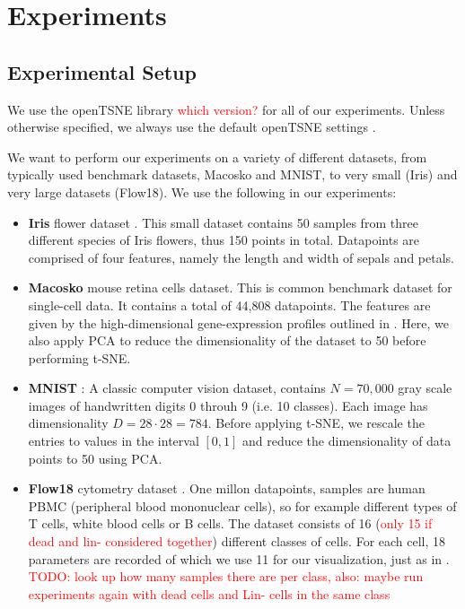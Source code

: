 \chapter{Experiments}\label{chapter:experiments}

\section{Experimental Setup}
We use the openTSNE library \textcolor{red}{which version?} for all of our experiments. Unless otherwise specified, we always use the default openTSNE settings . 

We want to perform our experiments on a variety of different datasets, from typically used benchmark datasets, Macosko and MNIST, to very small (Iris) and very large datasets (Flow18). We use the following in our experiments: 
\begin{itemize}
    \item \textbf{Iris} flower dataset \cite{iris_dataset}. This small dataset contains 50 samples from three different species of Iris flowers, thus 150 points in total. Datapoints are comprised of four features, namely the length and width of sepals and petals. 
    \item \textbf{Macosko} mouse retina cells dataset\cite{Macosko_dataset}. This is common benchmark dataset for single-cell data. It contains a total of 44,808 datapoints. The features are given by the high-dimensional gene-expression profiles outlined in \cite{Macosko_dataset}. 
    Here, we also apply PCA to reduce the dimensionality of the dataset to 50 before performing t-SNE. 
    \item \textbf{MNIST} \cite{mnist_dataset}: A classic computer vision dataset, contains $N=70,000$ gray scale images of handwritten digits 0 throuh 9 (i.e. 10 classes). 
    Each image has dimensionality $D=28 \cdot 28 = 784$. Before applying t-SNE, we rescale the entries to values in the interval $[0,1]$ and reduce the dimensionality of data points to 50 using PCA.  
    \item \textbf{Flow18} cytometry dataset \cite{flow_dataset}. 
    One millon datapoints, samples are human PBMC (peripheral blood mononuclear cells), so for example different types of T cells, white blood cells or B cells. 
    The dataset consists of 16 (\textcolor{red}{only 15 if dead and lin- considered together}) different classes of cells. For each cell, 18 parameters are recorded of which we use 11 for our visualization, just as in \cite{belkina19}. 
    \textcolor{red}{TODO: look up how many samples there are per class, also: maybe run experiments again with dead cells and Lin- cells in the same class}
\end{itemize}
